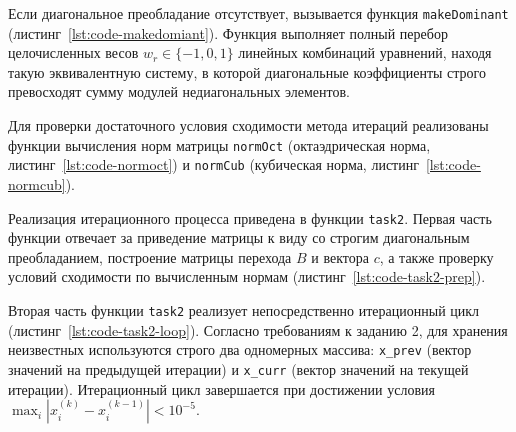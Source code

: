 Если диагональное преобладание отсутствует, вызывается функция \texttt{makeDominant} (листинг~\ref{lst:code-makedomiant}). Функция выполняет полный перебор целочисленных весов $w_r \in \{-1, 0, 1\}$ линейных комбинаций уравнений, находя такую эквивалентную систему, в которой диагональные коэффициенты строго превосходят сумму модулей недиагональных элементов.

\begin{listing}[H]
    \caption{Функция makeDominant для синтеза диагонально доминирующей матрицы}
    \label{lst:code-makedomiant}
\end{listing}

Для проверки достаточного условия сходимости метода итераций реализованы функции вычисления норм матрицы \texttt{normOct} (октаэдрическая норма, листинг~\ref{lst:code-normoct}) и \texttt{normCub} (кубическая норма, листинг~\ref{lst:code-normcub}).

\begin{listing}[H]
    \caption{Функция normOct для вычисления октаэдрической нормы матрицы}
    \label{lst:code-normoct}
\end{listing}

\begin{listing}[H]
    \caption{Функция normCub для вычисления кубической нормы матрицы}
    \label{lst:code-normcub}
\end{listing}

Реализация итерационного процесса приведена в функции \texttt{task2}. Первая часть функции отвечает за приведение матрицы к виду со строгим диагональным преобладанием, построение матрицы перехода $B$ и вектора $c$, а также проверку условий сходимости по вычисленным нормам (листинг~\ref{lst:code-task2-prep}).

\begin{listing}[H]
    \caption{Подготовка матрицы B и проверка сходимости в функции task2}
    \label{lst:code-task2-prep}
\end{listing}

Вторая часть функции \texttt{task2} реализует непосредственно итерационный цикл (листинг~\ref{lst:code-task2-loop}). Согласно требованиям к заданию 2, для хранения неизвестных используются строго два одномерных массива: \texttt{x\_prev} (вектор значений на предыдущей итерации) и \texttt{x\_curr} (вектор значений на текущей итерации). Итерационный цикл завершается при достижении условия $\max_i |x_i^{(k)} - x_i^{(k-1)}| < 10^{-5}$.

